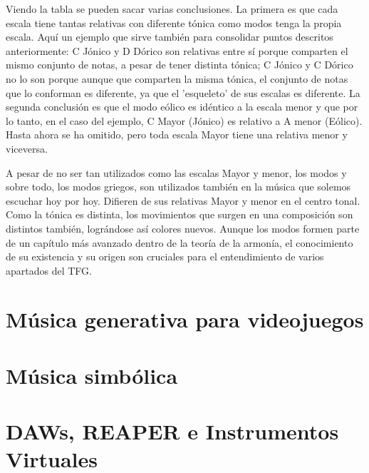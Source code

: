 Viendo la tabla se pueden sacar varias conclusiones. La primera es que cada escala tiene tantas relativas con diferente tónica como modos tenga la propia escala. Aquí un ejemplo que sirve también para consolidar puntos descritos anteriormente: C Jónico y D Dórico son relativas entre sí porque comparten el mismo conjunto de notas, a pesar de tener distinta tónica; C Jónico y C Dórico no lo son porque aunque que comparten la misma tónica, el conjunto de notas que lo conforman es diferente, ya que el 'esqueleto' de sus escalas es diferente. La segunda conclusión es que el modo eólico es idéntico a la escala menor y que por lo tanto, en el caso del ejemplo, C Mayor (Jónico) es relativo a A menor (Eólico). Hasta ahora se ha omitido, pero toda escala Mayor tiene una relativa menor y viceversa.

A pesar de no ser tan utilizados como las escalas Mayor y menor, los modos y sobre todo, los modos griegos, son utilizados también en la música que solemos escuchar hoy por hoy. Difieren de sus relativas Mayor y menor en el centro tonal. Como la tónica es distinta, los movimientos que surgen en una composición son distintos también, lográndose así colores nuevos. Aunque los modos formen parte de un capítulo más avanzado dentro de la teoría de la armonía, el conocimiento de su existencia y su origen son cruciales para el entendimiento de varios apartados del TFG.

\section{Música generativa para videojuegos}
\section{Música simbólica}

\section{DAWs, REAPER e Instrumentos Virtuales}

